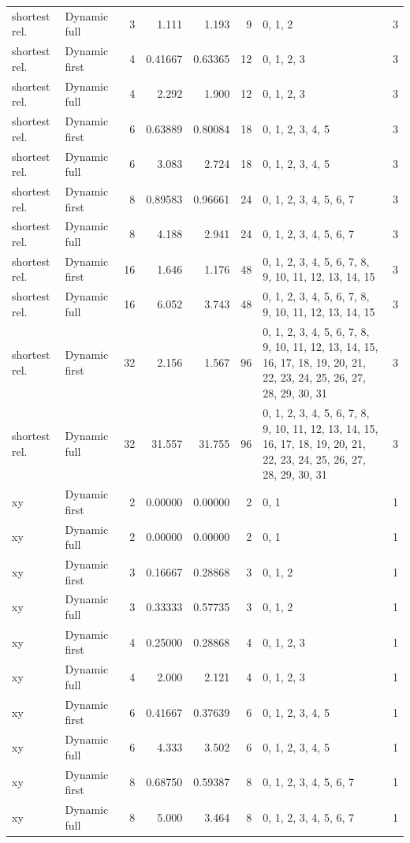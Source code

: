 \documentclass[10pt,a4paper]{article}
\begin{document}
\begin{longtable}{@{}p{23mm}p{29mm}rrrrp{36mm}r@{}}
shortest rel. & Dynamic full & 3 & 1.111 & 1.193 & 9 & 0, 1, 2 & 3 \\
shortest rel. & Dynamic first & 4 & 0.41667 & 0.63365 & 12 & 0, 1, 2, 3 & 3 \\
shortest rel. & Dynamic full & 4 & 2.292 & 1.900 & 12 & 0, 1, 2, 3 & 3 \\
shortest rel. & Dynamic first & 6 & 0.63889 & 0.80084 & 18 & 0, 1, 2, 3, 4, 5 & 3 \\
shortest rel. & Dynamic full & 6 & 3.083 & 2.724 & 18 & 0, 1, 2, 3, 4, 5 & 3 \\
shortest rel. & Dynamic first & 8 & 0.89583 & 0.96661 & 24 & 0, 1, 2, 3, 4, 5, 6, 7 & 3 \\
shortest rel. & Dynamic full & 8 & 4.188 & 2.941 & 24 & 0, 1, 2, 3, 4, 5, 6, 7 & 3 \\
shortest rel. & Dynamic first & 16 & 1.646 & 1.176 & 48 & 0, 1, 2, 3, 4, 5, 6, 7, 8, 9, 10, 11, 12, 13, 14, 15 & 3 \\
shortest rel. & Dynamic full & 16 & 6.052 & 3.743 & 48 & 0, 1, 2, 3, 4, 5, 6, 7, 8, 9, 10, 11, 12, 13, 14, 15 & 3 \\
shortest rel. & Dynamic first & 32 & 2.156 & 1.567 & 96 & 0, 1, 2, 3, 4, 5, 6, 7, 8, 9, 10, 11, 12, 13, 14, 15, 16, 17, 18, 19, 20, 21, 22, 23, 24, 25, 26, 27, 28, 29, 30, 31 & 3 \\
shortest rel. & Dynamic full & 32 & 31.557 & 31.755 & 96 & 0, 1, 2, 3, 4, 5, 6, 7, 8, 9, 10, 11, 12, 13, 14, 15, 16, 17, 18, 19, 20, 21, 22, 23, 24, 25, 26, 27, 28, 29, 30, 31 & 3 \\
xy & Dynamic first & 2 & 0.00000 & 0.00000 & 2 & 0, 1 & 1 \\
xy & Dynamic full & 2 & 0.00000 & 0.00000 & 2 & 0, 1 & 1 \\
xy & Dynamic first & 3 & 0.16667 & 0.28868 & 3 & 0, 1, 2 & 1 \\
xy & Dynamic full & 3 & 0.33333 & 0.57735 & 3 & 0, 1, 2 & 1 \\
xy & Dynamic first & 4 & 0.25000 & 0.28868 & 4 & 0, 1, 2, 3 & 1 \\
xy & Dynamic full & 4 & 2.000 & 2.121 & 4 & 0, 1, 2, 3 & 1 \\
xy & Dynamic first & 6 & 0.41667 & 0.37639 & 6 & 0, 1, 2, 3, 4, 5 & 1 \\
xy & Dynamic full & 6 & 4.333 & 3.502 & 6 & 0, 1, 2, 3, 4, 5 & 1 \\
xy & Dynamic first & 8 & 0.68750 & 0.59387 & 8 & 0, 1, 2, 3, 4, 5, 6, 7 & 1 \\
xy & Dynamic full & 8 & 5.000 & 3.464 & 8 & 0, 1, 2, 3, 4, 5, 6, 7 & 1 \\

\end{longtable}
\end{document}
